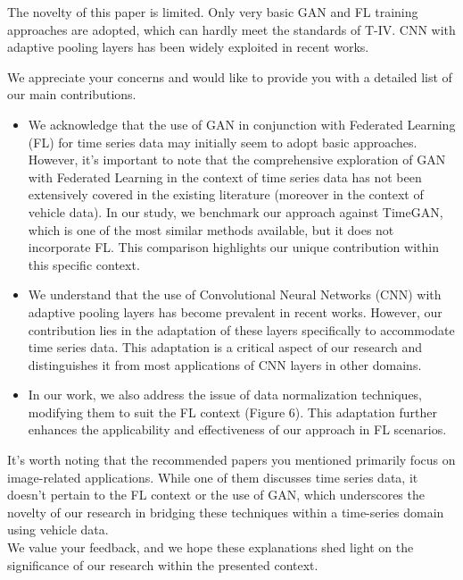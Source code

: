 \documentclass{article}
\begin{document}
\RC The novelty of this paper is limited. Only very basic GAN and FL training approaches are adopted, which can hardly meet the standards of T-IV. CNN with adaptive pooling layers has been widely exploited in recent works. 

\AR We appreciate your concerns and would like to provide you with a detailed list of our main contributions.
\begin{itemize}
	\item We acknowledge that the use of GAN in conjunction with Federated Learning (FL) for time series data may initially seem to adopt basic approaches. However, it's important to note that the comprehensive exploration of GAN with Federated Learning in the context of time series data has not been extensively covered in the existing literature (moreover in the context of vehicle data). In our study, we benchmark our approach against TimeGAN, which is one of the most similar methods available, but it does not incorporate FL. This comparison highlights our unique contribution within this specific context.
	\item We understand that the use of Convolutional Neural Networks (CNN) with adaptive pooling layers has become prevalent in recent works. However, our contribution lies in the adaptation of these layers specifically to accommodate time series data. This adaptation is a critical aspect of our research and distinguishes it from most applications of CNN layers in other domains.
	\item In our work, we also address the issue of data normalization techniques, modifying them to suit the FL context (Figure 6). This adaptation further enhances the applicability and effectiveness of our approach in FL scenarios.
\end{itemize}
It's worth noting that the recommended papers you mentioned primarily focus on image-related applications. While one of them discusses time series data, it doesn't pertain to the FL context or the use of GAN, which underscores the novelty of our research in bridging these techniques within a time-series domain using vehicle data.\\
We value your feedback, and we hope these explanations shed light on the significance of our research within the presented context.

\end{document}
